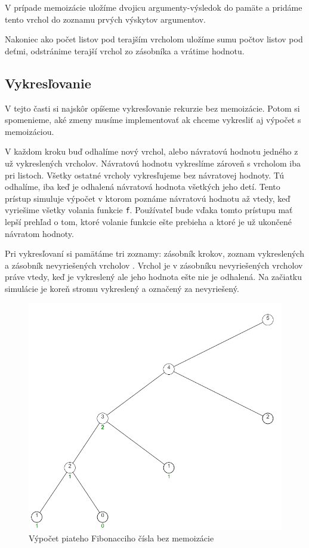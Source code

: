 V prípade memoizácie uložíme dvojicu argumenty-výsledok do
pamäte a pridáme tento vrchol do zoznamu prvých výskytov argumentov.

Nakoniec ako počet listov pod terajším vrcholom uložíme sumu počtov listov pod deťmi,
odstránime terajší vrchol zo zásobníka a vrátime hodnotu.

\subsection{Vykresľovanie}
V tejto časti si najskôr opíšeme vykresľovanie rekurzie bez memoizácie. Potom
si spomenieme, aké zmeny musíme implementovať ak chceme vykresliť aj výpočet s
memoizáciou.

V každom kroku buď odhalíme nový vrchol, alebo návratovú hodnotu jedného
z už vykreslených vrcholov. Návratovú hodnotu vykreslíme zároveň s vrcholom iba pri listoch.
Všetky ostatné vrcholy vykresľujeme bez návratovej hodnoty. Tú odhalíme, iba keď
je odhalená návratová hodnota všetkých jeho detí. Tento prístup simuluje výpočet v ktorom
poznáme návratovú hodnotu až vtedy, keď vyriešime všetky volania funkcie \lstinline[language=Javascript]{f}.
Používateľ bude vďaka tomto prístupu mať lepší prehľad o tom, ktoré volanie funkcie ešte prebieha
a ktoré je už ukončené návratom hodnoty.

Pri vykresľovaní si pamätáme tri zoznamy: zásobník krokov, zoznam vykreslených a zásobník
nevyriešených vrcholov . Vrchol je v zásobníku nevyriešených vrcholov práve vtedy,
keď je vykreslený ale jeho hodnota ešte nie je odhalená. Na začiatku simulácie je
koreň stromu vykreslený a označený za nevyriešený.

\begin{figure}[h]
\includegraphics[width=\textwidth,height=\textheight,keepaspectratio]{images/bezMemo.png}
\caption{Výpočet piateho Fibonacciho čísla bez memoizácie}
\label{obr:memo}
\end{figure}

